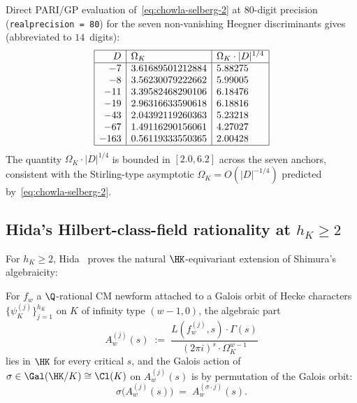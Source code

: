 \begin{example}\label{ex:omega-K-numerics}
Direct PARI/GP evaluation of~\eqref{eq:chowla-selberg-2} at $80$-digit
precision (\texttt{realprecision = 80}) for the seven non-vanishing
Heegner discriminants gives (abbreviated to $14$~digits):
\[
\begin{array}{|r|l|l|}
\hline
D & \Omega_K & \Omega_K \cdot |D|^{1/4} \\
\hline
-7   & 3.61689501212884 & 5.88275 \\
-8   & 3.56230079222662 & 5.99005 \\
-11  & 3.39582468290106 & 6.18476 \\
-19  & 2.96316633590618 & 6.18816 \\
-43  & 2.04392119260363 & 5.23218 \\
-67  & 1.49116290156061 & 4.27027 \\
-163 & 0.56119333550365 & 2.00428 \\
\hline
\end{array}
\]
The quantity $\Omega_K \cdot |D|^{1/4}$ is bounded in
$[2.0, 6.2]$ across the seven anchors, consistent with the
Stirling-type asymptotic $\Omega_K = O(|D|^{-1/4})$ predicted
by~\eqref{eq:chowla-selberg-2}.
\end{example}

\subsection{Hida's Hilbert-class-field rationality at $h_K \geq 2$}
\label{ss:hida}

For $h_K \geq 2$, Hida~\cite{Hida1981} proves the natural
$\HK$-equivariant extension of Shimura's algebraicity:

\begin{theorem}[Hida 1981]\label{thm:hida}
For $f_w$ a $\Q$-rational CM newform attached to a Galois orbit
of Hecke characters $\{\psi_K^{(j)}\}_{j=1}^{h_K}$ on $K$ of
infinity type $(w-1, 0)$, the algebraic part
\[
A_w^{(j)}(s) \;:=\; \frac{L(f_w^{(j)}, s) \cdot \Gamma(s)}{(2\pi i)^s \cdot \Omega_K^{w-1}}
\]
lies in $\HK$ for every critical $s$, and the Galois action of
$\sigma \in \Gal(\HK/K) \cong \Cl(K)$ on $A_w^{(j)}(s)$ is by
permutation of the Galois orbit:
\begin{equation}\label{eq:hida-galois-action}
\sigma\bigl(A_w^{(j)}(s)\bigr) \;=\; A_w^{(\sigma \cdot j)}(s).
\end{equation}
\end{theorem}

